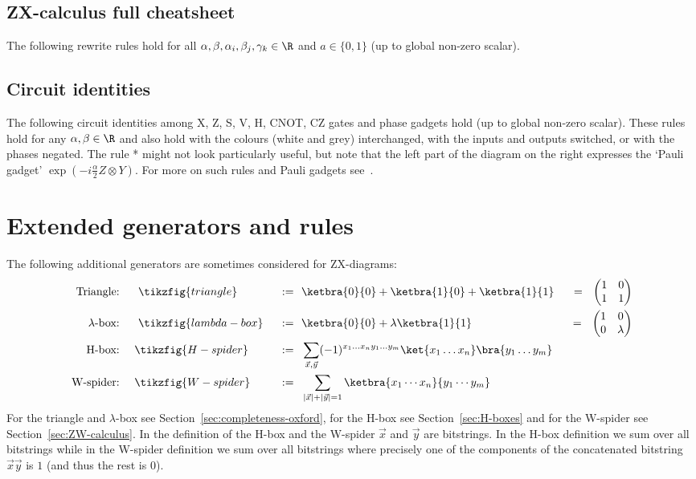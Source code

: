 \documentclass[a4paper,onecolumn,superscriptaddress,11pt,%
				unpublished,%
				allowfontchageintitle,%
				]{quantumarticle}
\begin{document}
\clearpage
\subsection{ZX-calculus full cheatsheet}
The following rewrite rules hold for all $\alpha,\beta, \alpha_i,\beta_j,\gamma_k\in \R$ and $a\in \{0,1\}$ (up to global non-zero scalar).

\clearpage
\subsection{Circuit identities}\label{app:circuit-identities}
The following circuit identities among X, Z, S, V, H, CNOT, CZ gates and phase gadgets hold (up to global non-zero scalar).
These rules hold for any $\alpha,\beta\in\R$ and also hold with the colours (white and grey) interchanged, with the inputs and outputs switched, or with the phases negated.
The rule * might not look particularly useful, but note that the left part of the diagram on the right expresses the `Pauli gadget' $\exp(-i\frac\alpha2 Z\otimes Y)$.
For more on such rules and Pauli gadgets see~\cite{phaseGadgetSynth}.

\section{Extended generators and rules}

The following additional generators are sometimes considered for ZX-diagrams:
\begin{align*}
	\text{Triangle:}& \ \ \quad \tikzfig{triangle} \ \ &:=& \ \ \ketbra{0}{0} + \ketbra{1}{0} + \ketbra{1}{1} \ \ &= \ \ \begin{pmatrix}1&0\\1&1\end{pmatrix}\\
	\text{$\lambda$-box:}& \ \ \quad \tikzfig{lambda-box} \ \ &:=& \ \ \ketbra{0}{0} + \lambda \ketbra{1}{1} \ \ &= \ \ \begin{pmatrix}1&0\\0&\lambda \end{pmatrix} \\
	\text{H-box:}& \ \ \ \ \tikzfig{H-spider} \ \ &:=& \ \ \sum_{\vec x, \vec y} (-1)^{x_1\ldots x_n y_1\ldots y_m} \ket{x_1\ldots x_n}\bra{y_1\ldots y_m} & \\
	\text{W-spider:}& \ \ \ \ \tikzfig{W-spider} \ \ &:=& \ \ \sum_{\lvert\vec x\rvert + \lvert \vec y\rvert = 1} \ketbra{x_1\cdots x_n}{y_1\cdots y_m}
\end{align*}
For the triangle and $\lambda$-box see Section~\ref{sec:completeness-oxford}, for the H-box see Section~\ref{sec:H-boxes} and for the W-spider see Section~\ref{sec:ZW-calculus}. In the definition of the H-box and the W-spider $\vec x$ and $\vec y$ are bitstrings. In the H-box definition we sum over all bitstrings while in the W-spider definition we sum over all bitstrings where precisely one of the components of the concatenated bitstring $\vec x\vec y$ is $1$ (and thus the rest is $0$).
\end{document}
